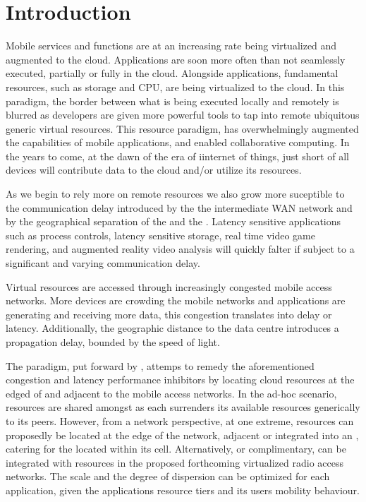 \section{Introduction}
Mobile services and \ue{} functions are at an increasing rate being virtualized and augmented to the cloud. Applications are soon more often than not seamlessly executed, partially or fully in the cloud. Alongside applications, fundamental \ue{} resources, such as storage and CPU, are being virtualized to the cloud. In this paradigm, the border between what is being executed locally and remotely is blurred as developers are given more powerful tools to tap into remote ubiquitous generic virtual resources. This resource paradigm, has overwhelmingly augmented the capabilities of mobile applications, and enabled collaborative computing. In the years to come, at the dawn of the era of iinternet of things, just short of all devices will contribute data to the cloud and/or utilize its resources.

As we begin to rely more on remote resources we also grow more suceptible to the communication delay introduced by the the intermediate WAN network and by the geographical separation of the \ue{} and the \dc{}. Latency sensitive applications such as process controls, latency sensitive storage, real time video game rendering, and augmented reality video analysis will quickly falter if subject to a significant and varying communication delay.

Virtual resources are accessed through increasingly congested mobile access networks. More devices are crowding the mobile networks and applications are generating and receiving more data, this congestion translates into delay or latency. Additionally, the geographic distance to the data centre introduces a propagation delay, bounded by the speed of light.

The \xcloud{} paradigm, put forward by \cite{chandra2013decentralized,ericsson_akami}, attemps to remedy the aforementioned congestion and latency performance inhibitors by locating cloud resources at the edged of and adjacent to the mobile access networks. In the ad-hoc scenario, resources are shared amongst \ues{} as each \ue{} surrenders its available resources generically to its peers. However, from a network perspective, at one extreme, \dc{} resources can proposedly be located at the edge of the network, adjacent or integrated into an \rbs{}, catering for the \ues{} located within its cell. Alternatively, or complimentary, \dcs{} can be integrated with resources in the proposed forthcoming virtualized radio access networks. The scale and the degree of dispersion can be optimized for each application, given the applications resource tiers and its users mobility behaviour.

